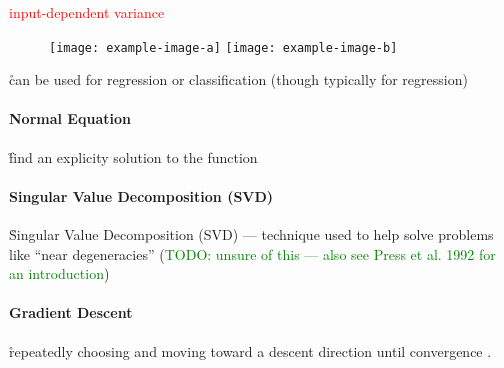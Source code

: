 \textcolor{red}{input-dependent variance}

\begin{figure}[htp]
	\centering
	\texttt{[image: example-image-a]}\hfil
	\texttt{[image: example-image-b]}\hfil
	\caption{ }
	\label{fig:basics_error_fn_sumofsquares_outlier}
\end{figure}

\r{can be used for regression or classification (though typically for regression)}

 
\paragraph{Normal Equation}




\r{find an explicity solution to the function}

\paragraph{Singular Value Decomposition (SVD)}

\r{Singular Value Decomposition (SVD) --- technique used to help solve problems like ``near degeneracies'' (\textcolor{green}{TODO: unsure of this --- also see Press et al. 1992 for an introduction})}


\paragraph{Gradient Descent}

\r{repeatedly choosing and moving toward a descent direction until convergence} . 


